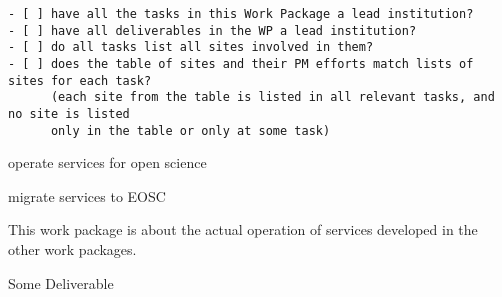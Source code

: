 \begin{draft}
\begin{verbatim}
- [ ] have all the tasks in this Work Package a lead institution?
- [ ] have all deliverables in the WP a lead institution?
- [ ] do all tasks list all sites involved in them?
- [ ] does the table of sites and their PM efforts match lists of sites for each task?
      (each site from the table is listed in all relevant tasks, and no site is listed
      only in the table or only at some task)
\end{verbatim}
\end{draft}

\begin{workpackage}[id=eosc,wphases=0-48,swsites,
  title=Services and EOSC Integration,
  short=EOSC,
  lead=SRL,
  EGIRM=20,
  SRLRM=18,
  UPSUDRM=4,
  WTTRM=6,
  XFELRM=6,
]
\begin{wpobjectives}
 \begin{compactitem}
   \item operate services for open science
   \item migrate services to EOSC
 \end{compactitem}
\end{wpobjectives}

\begin{wpdescription}

This work package is about the actual operation of services developed in the other work packages.


\end{wpdescription}

\begin{tasklist}
% 

\end{tasklist}




\begin{wpdelivs}
\begin{wpdeliv}[due=1,miles=startup,id=infrastructure,dissem=PU,nature=DEC,lead=SRL]
  {Some Deliverable}
\end{wpdeliv}

\end{wpdelivs}
\end{workpackage}

